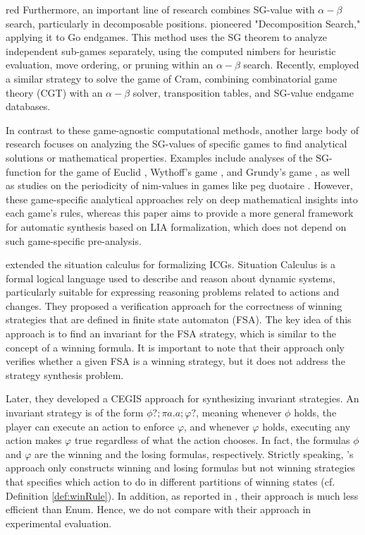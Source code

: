 \documentclass[review]{elsarticle}
\begin{document}
\begin{color}{red}
Furthermore, an important line of research combines SG-value with $\alpha-\beta$ search, particularly in decomposable positions. 
\cite{muller1999} pioneered "Decomposition Search," applying it to Go endgames. 
This method uses the SG theorem to analyze independent sub-games separately, using the computed nimbers for heuristic evaluation, move ordering, or pruning within an $\alpha-\beta$ search. 
Recently, \cite{uiterwijk2019} employed a similar strategy to solve the game of Cram, combining combinatorial game theory (CGT) with an $\alpha-\beta$ solver, transposition tables, and SG-value endgame databases.

In contrast to these game-agnostic computational methods, another large body of research focuses on analyzing the SG-values of specific games to find analytical solutions or mathematical properties. Examples include analyses of the SG-function for the game of Euclid \cite{cairns2011, nivasch2006}, Wythoff's game \cite{blass1990}, and Grundy's game \cite{guy1956g}, as well as studies on the periodicity of nim-values in games like peg duotaire \cite{grossman2004}. 
However, these game-specific analytical approaches rely on deep mathematical insights into each game's rules, whereas this paper aims to provide a more general framework for automatic synthesis based on LIA formalization, which does not depend on such game-specific pre-analysis.
\end{color}


\citet{LuoL2019} extended the situation calculus for formalizing ICGs.
Situation Calculus is a formal logical language used to describe and reason about dynamic systems, particularly suitable for expressing reasoning problems related to actions and changes.
They proposed a verification approach for the correctness of winning strategies that are defined in finite state automaton (FSA).
The key idea of this approach is to find an invariant for the FSA strategy, which is similar to the concept of a winning formula. It is important to note that their approach only verifies whether a given FSA is a winning strategy, but it does not address the strategy synthesis problem.
 
Later, they \cite{LuoL2022} developed a CEGIS approach for synthesizing invariant strategies.
An invariant strategy is of the form $\phi?; \pi a. a; \varphi?$, meaning whenever $\phi$ holds, the player can execute an action to enforce $\varphi$, and whenever $\varphi$ holds, executing any action makes $\varphi$ true regardless of what the action chooses.
In fact, the formulas $\phi$ and $\varphi$ are the winning and the losing formulas, respectively.
Strictly speaking, \citet{LuoL2022}'s approach only constructs winning and losing formulas but not winning strategies that specifies which action to do in different partitions of winning states (cf. Definition \ref{def:winRule}).
In addition, as reported in \cite{LuoL2022}, their approach is much less efficient than Enum.
Hence, we do not compare with their approach in experimental evaluation.
\end{document}

